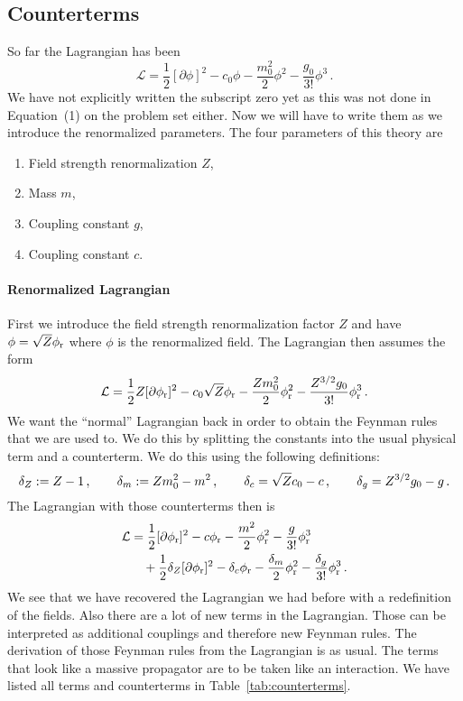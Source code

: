 \documentclass[11pt, english, fleqn, DIV=15, headinclude]{scrartcl}
\begin{document}
\subsection{Counterterms}

So far the Lagrangian has been
\[
    \mathcal L
    = \frac12 [\partial \phi]^2 - c_0 \phi - \frac{m_0^2}2\phi^2 -
    \frac{g_0}{3!} \phi^3 \,.
\]
We have not explicitly written the subscript zero yet as this was not done in
Equation~(1) on the problem set either. Now we will have to write them as we
introduce the renormalized parameters. The four parameters of this theory are

\begin{enumerate}
    \item Field strength renormalization $Z$,
    \item Mass $m$,
    \item Coupling constant $g$,
    \item Coupling constant $c$.
\end{enumerate}

\paragraph{Renormalized Lagrangian}

\newcommand\phir{\phi_\text r}

First we introduce the field strength renormalization factor $Z$ and have $\phi
= \sqrt Z \phir$ where $\phi$ is the renormalized field. The Lagrangian then
assumes the form
\[
    \mathcal L
    = \frac12 Z [\partial \phir]^2 - c_0 \sqrt Z \phir - \frac{Z m_0^2}2\phir^2
    - \frac{Z^{3/2} g_0}{3!} \phir^3 \,.
\]
We want the \enquote{normal} Lagrangian back in order to obtain the Feynman
rules that we are used to. We do this by splitting the constants into the usual
physical term and a counterterm. We do this using the following definitions:
\[
    \delta_Z := Z - 1
    \,,\qquad
    \delta_m := Z m_0^2 - m^2
    \,,\qquad
    \delta_c = \sqrt Z c_0 - c
    \,,\qquad
    \delta_g = Z^{3/2} g_0 - g
    \,.
\]
The Lagrangian with those counterterms then is
\[
    \begin{split}
    \mathcal L
    &= \frac12 [\partial \phir]^2 - c \phir - \frac{m^2}2\phir^2
    - \frac{g}{3!} \phir^3 \\
    &\quad+ \frac12 \delta_Z [\partial \phir]^2 - \delta_c \phir - \frac{\delta_m}2\phir^2
    - \frac{\delta_g}{3!} \phir^3 \,.
    \end{split}
\]
We see that we have recovered the Lagrangian we had before with a redefinition
of the fields. Also there are a lot of new terms in the Lagrangian. Those can
be interpreted as additional couplings and therefore new Feynman rules. The
derivation of those Feynman rules from the Lagrangian is as usual. The terms
that look like a massive propagator are to be taken like an interaction. We
have listed all terms and counterterms in Table~\ref{tab:counterterms}.
\end{document}
